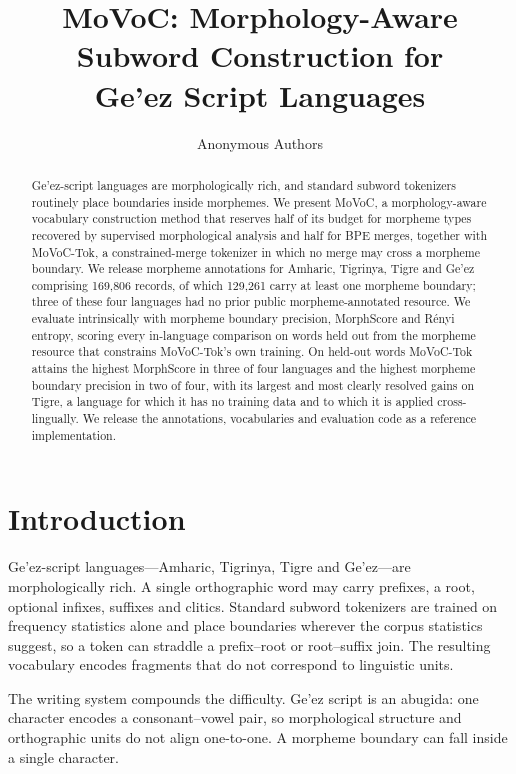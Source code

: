 \documentclass[11pt]{article}
\title{MoVoC: Morphology-Aware Subword Construction for\\Ge'ez Script Languages}
\author{Anonymous Authors}
\date{}
\begin{document}
\maketitle

\begin{abstract}
Ge'ez-script languages are morphologically rich, and standard subword
tokenizers routinely place boundaries inside morphemes. We present MoVoC, a
morphology-aware vocabulary construction method that reserves half of its
budget for morpheme types recovered by supervised morphological analysis and
half for BPE merges, together with MoVoC-Tok, a constrained-merge tokenizer in
which no merge may cross a morpheme boundary. We release morpheme annotations
for Amharic, Tigrinya, Tigre and Ge'ez comprising 169,806 records, of which
129,261 carry at least one morpheme boundary; three of these four languages had
no prior public morpheme-annotated resource. We evaluate intrinsically with
morpheme boundary precision, MorphScore and R\'enyi entropy, scoring every
in-language comparison on words held out from the morpheme resource that
constrains MoVoC-Tok's own training. On held-out words MoVoC-Tok attains the
highest MorphScore in three of four languages and the highest morpheme boundary
precision in two of four, with its largest and most clearly resolved gains on
Tigre, a language for which it has no training data and to which it is applied
cross-lingually. We release the annotations, vocabularies and evaluation code
as a reference implementation.
\end{abstract}

\section{Introduction}
\label{sec:intro}

Ge'ez-script languages---Amharic, Tigrinya, Tigre and Ge'ez---are
morphologically rich. A single orthographic word may carry prefixes, a root,
optional infixes, suffixes and clitics. Standard subword tokenizers are trained
on frequency statistics alone and place boundaries wherever the corpus
statistics suggest, so a token can straddle a prefix--root or root--suffix
join. The resulting vocabulary encodes fragments that do not correspond to
linguistic units.

The writing system compounds the difficulty. Ge'ez script is an abugida: one
character encodes a consonant--vowel pair, so morphological structure and
orthographic units do not align one-to-one. A morpheme boundary can fall inside
a single character.
\end{document}
